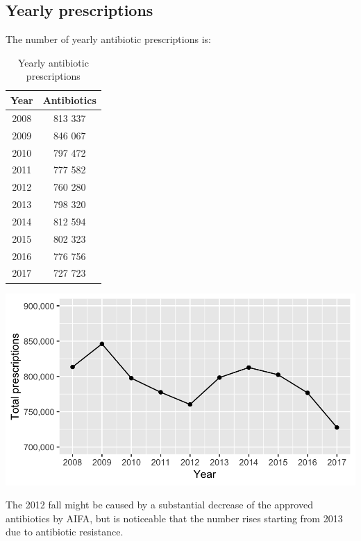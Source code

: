 \subsection{Yearly prescriptions}
The number of yearly antibiotic prescriptions is:
\begin{table}[!htb]
	\centering
	\parbox{0.25\textwidth}{
		\begin{footnotesize}
			\begin{tabular}{c|c}
				Year & Antibiotics \\
				\hline
				2008 & 813 337 \\
				\hline
				2009 & 846 067 \\
				\hline
				2010 & 797 472 \\
				\hline
				2011 & 777 582 \\
				\hline
				2012 & 760 280 \\
				\hline
				2013 & 798 320 \\
				\hline
				2014 & 812 594 \\
				\hline
				2015 & 802 323 \\
				\hline
				2016 & 776 756 \\
				\hline
				2017 & 727 723 \\
			\end{tabular}
		\end{footnotesize}
	}
	\qquad
	\begin{minipage}[c]{0.6\textwidth}
		\centering
		\includegraphics[width=1\textwidth]{../plots/yearly_prescriptions.png}
	\end{minipage}
\caption{\small Yearly antibiotic prescriptions}
\end{table}

The 2012 fall might be caused by a substantial decrease of the approved antibiotics by AIFA\cite{calo}, but is noticeable that the number rises starting from 2013 due to antibiotic resistance. 

